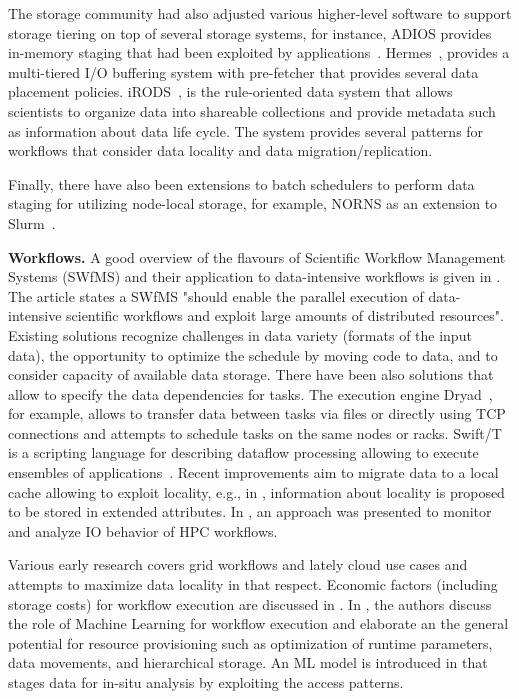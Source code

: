 \documentclass{superfri}
\begin{document}
The storage community had also adjusted various higher-level software to support storage tiering on top of several storage systems, for instance, ADIOS provides in-memory staging that had been exploited by applications~\cite{slawinska2013maya}.
Hermes~\cite{kougkas2020acceleration}, provides a multi-tiered I/O buffering system with pre-fetcher that provides several data placement policies.
iRODS~\cite{rajasekar2010irods}, is the rule-oriented data system that allows scientists to organize data into shareable collections and provide metadata such as information about data life cycle.
The system provides several patterns for workflows that consider data locality and data migration/replication.

Finally, there have also been extensions to batch schedulers to perform data staging for utilizing node-local storage, for example, NORNS as an extension to Slurm~\cite{miranda2019norns}.

\smallskip

\textbf{Workflows. }
A good overview of the flavours of Scientific Workflow Management Systems (SWfMS) and their application to data-intensive workflows is given in \cite{liu2015survey}.
The article states a SWfMS "should enable the parallel execution of data-intensive scientific workflows and exploit large amounts of distributed resources".
Existing solutions recognize challenges in data variety (formats of the input data), the opportunity to optimize the schedule by moving code to data, and to consider capacity of available data storage.
There have been also solutions that allow to specify the data dependencies for tasks.
The execution engine Dryad~\cite{isard2007dryad}, for example, allows to transfer data between tasks via files or directly using TCP connections and attempts to schedule tasks on the same nodes or racks.
Swift/T is a scripting language for describing dataflow processing allowing to execute ensembles of applications~\cite{ozik2016desktop}.
Recent improvements aim to migrate data to a local cache allowing to exploit locality, e.g., in \cite{dai2018cross}, information about locality is proposed to be stored in extended attributes.
In \cite{TUIBIHWLSC19}, an approach was presented to monitor and analyze IO behavior of HPC workflows.

Various early research covers grid workflows and lately cloud use cases and attempts to maximize data locality in that respect.
Economic factors (including storage costs) for workflow execution are discussed in \cite{alkhanak2016cost}.
In \cite{deelman2019role}, the authors discuss the role of Machine Learning for workflow execution and elaborate an the general potential for resource provisioning such as optimization of runtime parameters, data movements, and hierarchical storage.
An ML model is introduced in \cite{subedi2019leveraging} that stages data for in-situ analysis by exploiting the access patterns.
\end{document}
